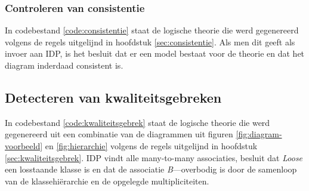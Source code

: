 \subsubsection{Controleren van consistentie}
In codebestand \ref{code:consistentie} staat de logische theorie die werd gegenereerd volgens de regels uitgelijnd in hoofdstuk \ref{sec:consistentie}. Als men dit geeft als invoer aan IDP, is het besluit dat er een model bestaat voor de theorie en dat het diagram inderdaad consistent is.

\subsection{Detecteren van kwaliteitsgebreken}
In codebestand \ref{code:kwaliteitsgebrek} staat de logische theorie die werd gegenereerd uit een combinatie van de diagrammen uit figuren \ref{fig:diagram-voorbeeld} en \ref{fig:hierarchie} volgens de regels uitgelijnd in hoofdstuk \ref{sec:kwaliteitsgebrek}. IDP vindt alle many-to-many associaties, besluit dat \textit{Loose} een losstaande klasse is en dat de associatie \textit{B}---\text overbodig is door de samenloop van de klassehi\"erarchie en de opgelegde multipliciteiten.

\label{code:consistentie}
\label{code:kwaliteitsgebrek}